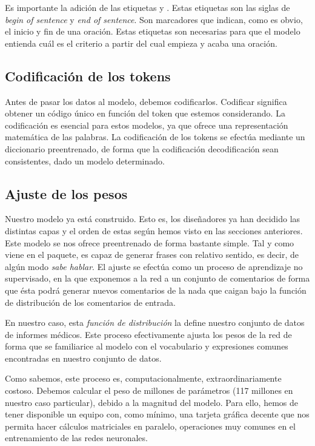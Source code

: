 Es importante la adición de las etiquetas  y . Estas etiquetas son las siglas de \textit{begin of sentence} y \textit{end of sentence}. Son marcadores que indican, como es obvio, el inicio y fin de una oración. Estas etiquetas son necesarias para que el modelo entienda cuál es el criterio a partir del cual empieza y acaba una oración.

\subsection{Codificación de los tokens}
Antes de pasar los datos al modelo, debemos codificarlos. Codificar significa obtener un código único en función del token que estemos considerando. La codificación es esencial para estos modelos, ya que ofrece una representación matemática de las palabras. La codificación de los tokens se efectúa mediante un diccionario preentrenado, de forma que la codificación decodificación sean consistentes, dado un modelo determinado.


\subsection{Ajuste de los pesos}
Nuestro modelo ya está construido. Esto es, los diseñadores ya han decidido las distintas capas y el orden de estas según hemos visto en las secciones anteriores. Este modelo se nos ofrece preentrenado de forma bastante simple. Tal y como viene en el paquete, es capaz de generar frases con relativo sentido, es decir, de algún modo \textit{sabe hablar}. El ajuste se efectúa como un proceso de aprendizaje no supervisado, en la que exponemos a la red a un conjunto de comentarios de forma que ésta podrá generar nuevos comentarios de la nada que caigan bajo la función de distribución de los comentarios de entrada. 

En nuestro caso, esta \textit{función de distribución} la define nuestro conjunto de datos de informes médicos. Este proceso efectivamente ajusta los pesos de la red de forma que se familiarice al modelo con el vocabulario y expresiones comunes encontradas en nuestro conjunto de datos.

Como sabemos, este proceso es, computacionalmente, extraordinariamente costoso. Debemos calcular el peso de millones de parámetros (117 millones en nuestro caso particular), debido a la magnitud del modelo. Para ello, hemos de tener disponible un equipo con, como mínimo, una tarjeta gráfica decente que nos permita hacer cálculos matriciales en paralelo, operaciones muy comunes en el entrenamiento de las redes neuronales.

